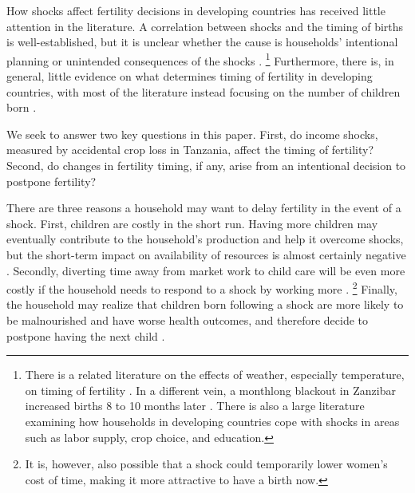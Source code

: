 \documentclass[letterpaper,12pt]{article}
\begin{document}
How shocks affect fertility decisions in developing countries has 
received little attention in the literature.
A correlation between shocks and the timing of births is well-established, but it is 
unclear whether the cause is households' intentional planning or unintended consequences 
of the shocks \citep{pitt98b,lindstrom99,Evans2010,Portner2014}.%
\footnote{
There is a related literature on the effects of weather, especially temperature,
on timing of fertility \citep[see, for example,][]{Barreca2015}.
In a different vein, a monthlong blackout in Zanzibar increased 
births 8 to 10 months later \citep{Burlando2014}.
There is also a large literature examining how households in developing countries
cope with shocks in areas such as labor supply, crop choice, and education.
}
Furthermore, there is, in general, little evidence on what determines timing 
of fertility in developing countries, with most of the literature instead 
focusing on the number of children born \citep{Portner2018}.

We seek to answer two key questions in this paper.
First, do income shocks, measured by accidental crop loss in Tanzania, affect the
timing of fertility?
Second, do changes in fertility timing, if any, arise from an intentional decision
to postpone fertility?

There are three reasons a household may want to delay fertility in the
event of a shock.
First, children are costly in the short run.
Having more children may eventually contribute to the household's production 
and help it overcome shocks, but the short-term impact on availability 
of resources is almost certainly negative \citep{Portner2014}.
Secondly, diverting time away from market work to child care will be even more 
costly if the household needs to respond to a shock by working more \citep{kochar99}.%
\footnote{
It is, however, also possible that a shock could temporarily lower women's 
cost of time, making it more attractive to have a birth now.
}
Finally, the household may realize that children born following a shock 
are more likely to be malnourished and have worse health outcomes, and therefore 
decide to postpone having the next child \citep{Portner2010}.
\end{document}
